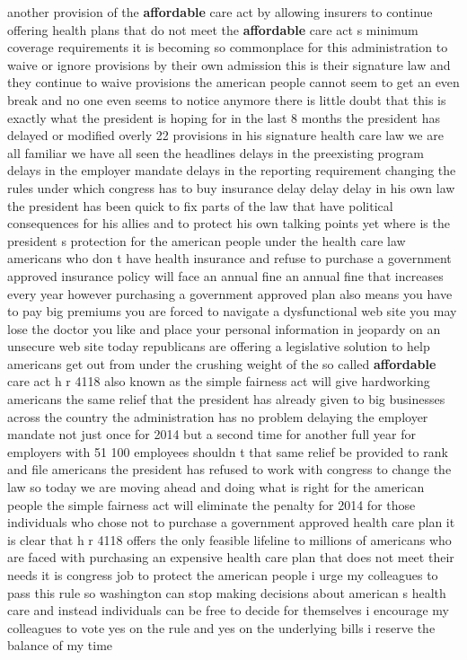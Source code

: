 \documentclass{article}
\begin{document}
another provision of the {\bf \color{red} affordable} care act by allowing insurers to continue offering health plans that do not meet the {\bf \color{red} affordable} care act s minimum coverage requirements it is becoming so commonplace for this administration to waive or ignore provisions by their own admission this is their signature law and they continue to waive provisions the american people cannot seem to get an even break and no one even seems to notice anymore there is little doubt that this is exactly what the president is hoping for in the last 8 months the president has delayed or modified overly 22 provisions in his signature health care law we are all familiar we have all seen the headlines delays in the preexisting program delays in the employer mandate delays in the reporting requirement changing the rules under which congress has to buy insurance delay delay delay in his own law the president has been quick to fix parts of the law that have political consequences for his allies and to protect his own talking points yet where is the president s protection for the american people under the health care law americans who don t have health insurance and refuse to purchase a government approved insurance policy will face an annual fine an annual fine that increases every year however purchasing a government approved plan also means you have to pay big premiums you are forced to navigate a dysfunctional web site you may lose the doctor you like and place your personal information in jeopardy on an unsecure web site today republicans are offering a legislative solution to help americans get out from under the crushing weight of the so called {\bf \color{red} affordable} care act h r 4118 also known as the simple fairness act will give hardworking americans the same relief that the president has already given to big businesses across the country the administration has no problem delaying the employer mandate not just once for 2014 but a second time for another full year for employers with 51 100 employees shouldn t that same relief be provided to rank and file americans the president has refused to work with congress to change the law so today we are moving ahead and doing what is right for the american people the simple fairness act will eliminate the penalty for 2014 for those individuals who chose not to purchase a government approved health care plan it is clear that h r 4118 offers the only feasible lifeline to millions of americans who are faced with purchasing an expensive health care plan that does not meet their needs it is congress job to protect the american people i urge my colleagues to pass this rule so washington can stop making decisions about american s health care and instead individuals can be free to decide for themselves i encourage my colleagues to vote yes on the rule and yes on the underlying bills i reserve the balance of my time\pagebreak
\end{document}

